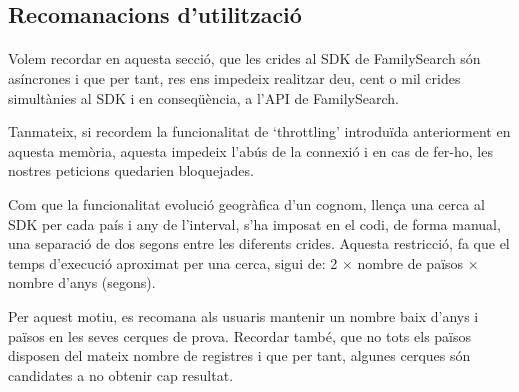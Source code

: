 \subsection{Recomanacions d'utilització}

    \paragraph{}
    Volem recordar en aquesta secció, que les crides al SDK de FamilySearch són asíncrones i que per tant, res ens impedeix realitzar deu, cent o mil crides simultànies al SDK i en conseqüència, a l’API de FamilySearch.

    Tanmateix, si recordem la funcionalitat de `throttling' introduïda anteriorment en aquesta memòria, aquesta impedeix l’abús de la connexió i en cas de fer-ho, les nostres peticions quedarien bloquejades.

    Com que la funcionalitat evolució geogràfica d’un cognom, llença una cerca al SDK per cada país i any de l’interval, s'ha imposat en el codi, de forma manual, una separació de dos segons entre les diferents crides. Aquesta restricció, fa que el temps d'execució aproximat per una cerca, sigui de: 2 $\times$ nombre de països $\times$ nombre d'anys (segons).

    Per aquest motiu, es recomana als usuaris mantenir un nombre baix d'anys i països en les seves cerques de prova. Recordar també, que no tots els països disposen del mateix nombre de registres i que per tant, algunes cerques són candidates a no obtenir cap resultat.
